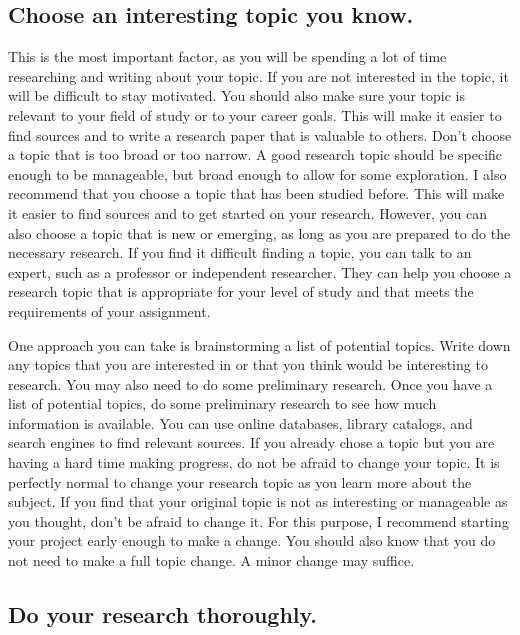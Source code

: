 \documentclass[
]{book}
\begin{document}
\hypertarget{choose-an-interesting-topic-you-know.}{%
\subsection*{Choose an interesting topic you know.}\label{choose-an-interesting-topic-you-know.}}

This is the most important factor, as you will be spending a lot of time researching and writing about your topic. If you are not interested in the topic, it will be difficult to stay motivated. You should also make sure your topic is relevant to your field of study or to your career goals. This will make it easier to find sources and to write a research paper that is valuable to others. Don't choose a topic that is too broad or too narrow. A good research topic should be specific enough to be manageable, but broad enough to allow for some exploration. I also recommend that you choose a topic that has been studied before. This will make it easier to find sources and to get started on your research. However, you can also choose a topic that is new or emerging, as long as you are prepared to do the necessary research. If you find it difficult finding a topic, you can talk to an expert, such as a professor or independent researcher. They can help you choose a research topic that is appropriate for your level of study and that meets the requirements of your assignment.

One approach you can take is brainstorming a list of potential topics. Write down any topics that you are interested in or that you think would be interesting to research. You may also need to do some preliminary research. Once you have a list of potential topics, do some preliminary research to see how much information is available. You can use online databases, library catalogs, and search engines to find relevant sources. If you already chose a topic but you are having a hard time making progress, do not be afraid to change your topic. It is perfectly normal to change your research topic as you learn more about the subject. If you find that your original topic is not as interesting or manageable as you thought, don't be afraid to change it. For this purpose, I recommend starting your project early enough to make a change. You should also know that you do not need to make a full topic change. A minor change may suffice.

\hypertarget{do-your-research-thoroughly.}{%
\subsection*{Do your research thoroughly.}\label{do-your-research-thoroughly.}}
\end{document}
